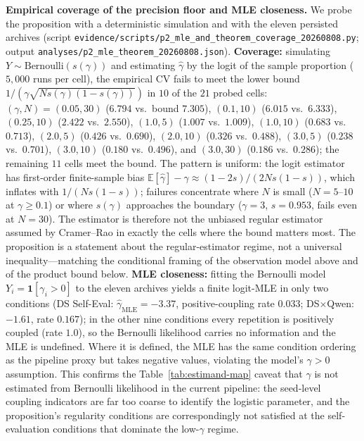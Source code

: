 \documentclass[11pt]{article}
\begin{document}
\noindent\textbf{Empirical coverage of the precision floor and MLE closeness.} We probe the proposition with a deterministic simulation and with the eleven persisted archives (script \texttt{evidence/scripts/p2\_mle\_and\_theorem\_coverage\_20260808.py}; output \texttt{analyses/p2\_mle\_theorem\_20260808.json}). \textbf{Coverage:} simulating $Y\sim\mathrm{Bernoulli}(s(\gamma))$ and estimating $\hat\gamma$ by the logit of the sample proportion ($5{,}000$ runs per cell), the empirical $\mathrm{CV}$ fails to meet the lower bound $1/(\gamma\sqrt{N s(\gamma)(1-s(\gamma))})$ in $10$ of the $21$ probed cells: $(\gamma,N)=(0.05,30)$ ($6.794$ vs.\ bound $7.305$), $(0.1,10)$ ($6.015$ vs.\ $6.333$), $(0.25,10)$ ($2.422$ vs.\ $2.550$), $(1.0,5)$ ($1.007$ vs.\ $1.009$), $(1.0,10)$ ($0.683$ vs.\ $0.713$), $(2.0,5)$ ($0.426$ vs.\ $0.690$), $(2.0,10)$ ($0.326$ vs.\ $0.488$), $(3.0,5)$ ($0.238$ vs.\ $0.701$), $(3.0,10)$ ($0.180$ vs.\ $0.496$), and $(3.0,30)$ ($0.186$ vs.\ $0.286$); the remaining $11$ cells meet the bound. The pattern is uniform: the logit estimator has first-order finite-sample bias $\mathbb{E}[\hat\gamma]-\gamma\approx(1-2s)/(2N s(1-s))$, which inflates with $1/(N s(1-s))$; failures concentrate where $N$ is small ($N{=}5$--$10$ at $\gamma\geq0.1$) or where $s(\gamma)$ approaches the boundary ($\gamma{=}3$, $s{=}0.953$, fails even at $N{=}30$). The estimator is therefore not the unbiased regular estimator assumed by Cramer--Rao in exactly the cells where the bound matters most. The proposition is a statement about the regular-estimator regime, not a universal inequality---matching the conditional framing of the observation model above and of the product bound below. \textbf{MLE closeness:} fitting the Bernoulli model $Y_i=\mathbf{1}[\gamma_i>0]$ to the eleven archives yields a finite logit-MLE in only two conditions (DS Self-Eval: $\hat\gamma_{\mathrm{MLE}}{=}-3.37$, positive-coupling rate $0.033$; DS$\times$Qwen: $-1.61$, rate $0.167$); in the other nine conditions every repetition is positively coupled (rate $1.0$), so the Bernoulli likelihood carries no information and the MLE is undefined. Where it is defined, the MLE has the same condition ordering as the pipeline proxy but takes negative values, violating the model's $\gamma>0$ assumption. This confirms the Table~\ref{tab:estimand-map} caveat that $\gamma$ is not estimated from Bernoulli likelihood in the current pipeline: the seed-level coupling indicators are far too coarse to identify the logistic parameter, and the proposition's regularity conditions are correspondingly not satisfied at the self-evaluation conditions that dominate the low-$\gamma$ regime.
\end{document}
